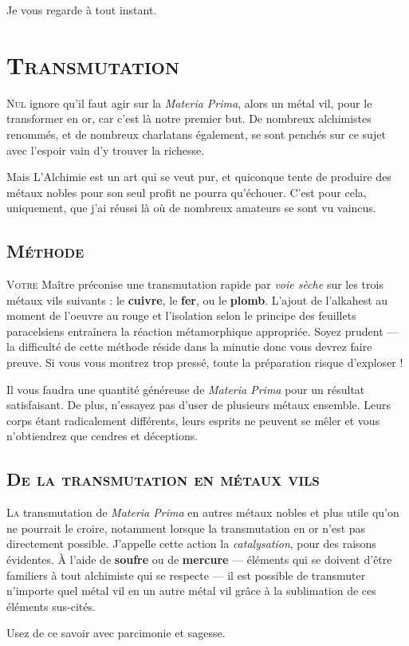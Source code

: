 Je vous regarde à tout instant.

\section{\textsc{Transmutation}}

\lettrine{N}{ul} ignore qu'il faut agir sur la \emph{Materia Prima}, alors un métal vil,
pour le transformer en or, car c'est là notre premier but. De nombreux
alchimistes renommés, et de nombreux charlatans également, se sont penchés sur
ce sujet avec l'espoir vain d'y trouver la richesse.

Mais L'Alchimie est un art qui se veut pur, et quiconque tente de produire
des métaux nobles pour son seul profit ne pourra qu'échouer. C'est pour cela,
uniquement, que j'ai réussi là où de nombreux amateurs se sont vu vaincus.

\subsection{\textsc{Méthode}}

\lettrine{V}{otre} Maître préconise une transmutation rapide par \emph{voie sèche} sur
les trois métaux vils suivants : le \textbf{cuivre}, le \textbf{fer}, ou le
\textbf{plomb}. L'ajout de l'alkahest au moment de l'oeuvre au rouge et
l'isolation selon le principe des feuillets paracelsiens entraînera la réaction
métamorphique appropriée. Soyez prudent — la difficulté de cette méthode réside dans la
minutie donc vous devrez faire preuve. Si vous vous montrez trop pressé, toute
la préparation risque d'exploser !

Il vous faudra une quantité généreuse de \emph{Materia Prima} pour un résultat
satisfaisant. De plus, n'essayez pas d'user de plusieurs métaux ensemble. Leurs
corps étant radicalement différents, leurs esprits ne peuvent se mêler et vous
n'obtiendrez que cendres et déceptions.

\subsection{\textsc{De la transmutation en métaux vils}}

\lettrine{L}{a} transmutation de \emph{Materia Prima} en autres métaux nobles et plus utile
qu'on ne pourrait le croire, notamment lorsque la transmutation en or n'est pas
directement possible. J'appelle cette action la \emph{catalysation}, pour des
raisons évidentes. À l'aide de \textbf{soufre} ou de \textbf{mercure} —
éléments qui se doivent d'être familiers à tout alchimiste qui se respecte — il
est possible de transmuter n'importe quel métal vil en un autre métal vil grâce
à la sublimation de ces éléments sus-cités.


Usez de ce savoir avec parcimonie et sagesse.

\section{}



